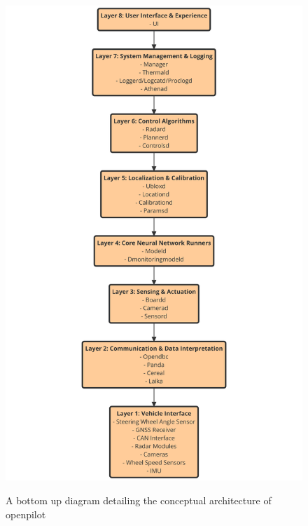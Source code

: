 \documentclass[12pt]{article}
\begin{document}
    \begin{figure}[ht]
        \centering
        \includegraphics[scale=0.15]{Assets/layers.png}\\
        \caption{A bottom up diagram detailing the conceptual architecture of openpilot}
        \label{fig:enter-label}
    \end{figure}
\end{document}
